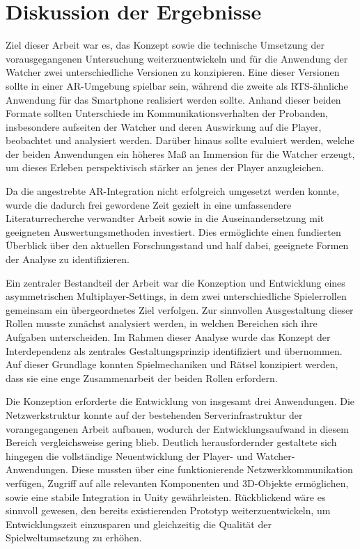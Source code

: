 \chapter{Diskussion der Ergebnisse}\label{sec:discussion}

Ziel dieser Arbeit war es, das Konzept sowie die technische Umsetzung der vorausgegangenen Untersuchung weiterzuentwickeln und für die Anwendung der Watcher zwei unterschiedliche Versionen zu konzipieren. Eine dieser Versionen sollte in einer \ac{AR}-Umgebung spielbar sein, während die zweite als \ac{RTS}-ähnliche Anwendung für das Smartphone realisiert werden sollte. Anhand dieser beiden Formate sollten Unterschiede im Kommunikationsverhalten der Probanden, insbesondere aufseiten der Watcher und deren Auswirkung auf die Player, beobachtet und analysiert werden. Darüber hinaus sollte evaluiert werden, welche der beiden Anwendungen ein höheres Maß an Immersion für die Watcher erzeugt, um dieses Erleben perspektivisch stärker an jenes der Player anzugleichen.

Da die angestrebte \ac{AR}-Integration nicht erfolgreich umgesetzt werden konnte, wurde die dadurch frei gewordene Zeit gezielt in eine umfassendere Literaturrecherche verwandter Arbeit sowie in die Auseinandersetzung mit geeigneten Auswertungsmethoden investiert. Dies ermöglichte einen fundierten Überblick über den aktuellen Forschungsstand und half dabei, geeignete Formen der Analyse zu identifizieren.

Ein zentraler Bestandteil der Arbeit war die Konzeption und Entwicklung eines asymmetrischen Multiplayer-Settings, in dem zwei unterschiedliche Spielerrollen gemeinsam ein übergeordnetes Ziel verfolgen. Zur sinnvollen Ausgestaltung dieser Rollen musste zunächst analysiert werden, in welchen Bereichen sich ihre Aufgaben unterscheiden. Im Rahmen dieser Analyse wurde das Konzept der Interdependenz als zentrales Gestaltungsprinzip identifiziert und übernommen. Auf dieser Grundlage konnten Spielmechaniken und Rätsel konzipiert werden, dass sie eine enge Zusammenarbeit der beiden Rollen erfordern.

Die Konzeption erforderte die Entwicklung von insgesamt drei Anwendungen. Die Netzwerkstruktur konnte auf der bestehenden Serverinfrastruktur der vorangegangenen Arbeit aufbauen, wodurch der Entwicklungsaufwand in diesem Bereich vergleichsweise gering blieb. Deutlich herausfordernder gestaltete sich hingegen die vollständige Neuentwicklung der Player- und Watcher-Anwendungen. Diese mussten über eine funktionierende Netzwerkkommunikation verfügen, Zugriff auf alle relevanten Komponenten und \ac{3D}-Objekte ermöglichen, sowie eine stabile Integration in Unity gewährleisten. Rückblickend wäre es sinnvoll gewesen, den bereits existierenden Prototyp weiterzuentwickeln, um Entwicklungszeit einzusparen und gleichzeitig die Qualität der Spielweltumsetzung zu erhöhen.

